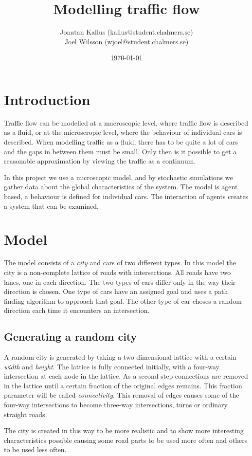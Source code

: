 \documentclass[11pt,a4paper]{article}
\author{Jonatan Kallus (kallus@student.chalmers.se)\\
Joel Wilsson (wjoel@student.chalmers.se)}
\date{\today}
\title{Modelling traffic flow}
\begin{document}
\maketitle

\section{Introduction}
Traffic flow can be modelled at a macroscopic level, where traffic flow is
described as a fluid, or at the microscropic level, where the behaviour of
individual cars is described. When modelling traffic as a fluid, there has
to be quite a lot of cars and the gaps in between them must be small. Only
then is it possible to get a reasonable approximation by viewing the traffic
as a continuum. \cite{aziz}

In this project we use a microscopic model, and by stochastic simulations
we gather data about the global characteristics of the system. The model is agent based, a behaviour is defined for individual cars. The interaction of agents creates a system that can be examined.

\section{Model}
The model consists of a \textit{city} and cars of two different types. In this model the city is a non-complete lattice of roads with intersections. All roads have two lanes, one in each direction. The two types of cars differ only in the way their direction is chosen. One type of cars have an assigned goal and uses a path finding algorithm to approach that goal. The other type of car choses a random direction each time it encounters an intersection.
\subsection{Generating a random city}
A random city is generated by taking a two dimensional lattice with a certain \textit{width} and \textit{height}. The lattice is fully connected initially, with a four-way intersection at each node in the lattice. As a second step connections are removed in the lattice until a certain fraction of the original edges remains. This fraction parameter will be called \textit{connectivity}. This removal of edges causes some of the four-way intersections to become three-way intersections, turns or ordinary straight roads.

The city is created in this way to be more realistic and to show more interesting characteristics possible causing some road parts to be used more often and others to be used less often.
\end{document}

